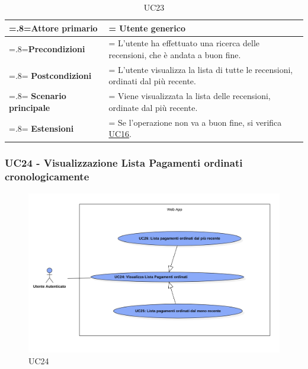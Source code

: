                 \begin{table}[H]
                    \centering
                    \renewcommand{\arraystretch}{1.8}
                    \renewcommand\tabularxcolumn[1]{m{#1}}
                    \begin{tabularx}{0.9\textwidth} {
                        >{\hsize=.8\hsize\linewidth=\hsize}X
                        >{\hsize=1.2\hsize\linewidth=\hsize}X}
                        \hline
                        \textbf{Attore primario} & Utente generico \\
                        \hline
                        \textbf{Precondizioni} & L'utente ha effettuato una ricerca delle recensioni, che è andata a buon fine. \\
                        \hline
                        \textbf{Postcondizioni} & L'utente visualizza la lista di tutte le recensioni, ordinati dal più recente. \\
                        \hline
                        \textbf{Scenario principale} & Viene visualizzata la lista delle recensioni, ordinate dal più recente. \\
                        \hline
                        \textbf{Estensioni} & Se l'operazione non va a buon fine, si verifica \hyperref[UC16]{UC16}. \\
                        \hline
                    \end{tabularx}
                    \caption{UC23}
                \end{table}

                \subsubsection{UC24 - Visualizzazione Lista Pagamenti ordinati cronologicamente}
            \label{UC24}

            \begin{figure}[H]
                \centering
                \includegraphics[scale=0.4]{src/img/UC24.png}
                \caption{UC24}
            \end{figure}


